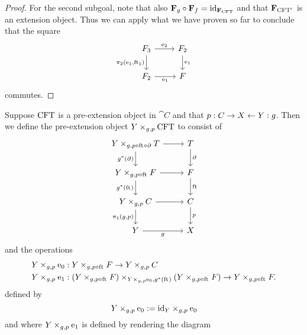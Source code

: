 \begin{proof}
For the second subgoal, note that also $\mathbf{F}_{g}\circ\mathbf{F}_{f}=
{\mathrm{id}_{\mathbf{F}_{\mathrm{CFT}}}}$ and that $\mathbf{F}_{\mathrm{CFT}'}$ is an extension object.
Thus we can apply what we have proven so far to conclude that the square
\begin{equation*}
\begin{tikzcd}
\stesysf_3 
  \ar{r}{\eext{2}} 
  \ar{d}[swap]{\pullbackpr{2}{\efamext}{\eft[1]}} 
  & 
\stesysf_2 
  \ar{d}{\efamext}
  \\
\stesysf_2
  \ar{r}[swap]{\efamext} 
  & 
\stesysf
\end{tikzcd}
\end{equation*}
commutes.
\end{proof}

\begin{defn}\label{cobesys}
Suppose $\mathrm{CFT}$ is a pre-extension object in $\cat{C}$ and that 
$p:C\rightarrow X\leftarrow Y:g$.
Then we define the pre-extension object $\cobesys{Y}{\stesys}{g}{p}$ to consist of
\begin{equation*}
\begin{tikzcd}
\cobesys{Y}{\stesyst}{g}{p\circ\eft\circ\ebd}
  \ar{r}
  \ar{d}[swap]{g^\ast(\ebd)}
  &
\stesyst
  \ar{d}{\ebd}
  \\
\cobesys{Y}{\stesysf}{g}{p\circ\eft}
  \ar{r}
  \ar{d}[swap]{g^\ast(\eft)}
  &
\stesysf
  \ar{d}{\eft}
  \\
\cobesys{Y}{\stesysc}{g}{p}
  \ar{r}
  \ar{d}[swap]{\pullbackpr{1}{g}{p}}
  &
\stesysc
  \ar{d}{p}
  \\
Y \ar{r}[swap]{g}
  &
X
\end{tikzcd}
\end{equation*} 
and the operations
\begin{align*}
\cobesys{Y}{\ectxext}{g}{p} 
  & : \pullback{Y}{\stesysf}{g}{p\circ\eft}\to \pullback{Y}{\stesysc}{g}{p}\\
\cobesys{Y}{\efamext}{g}{p} 
  & : \pullback
    {\pullback{Y}{\stesysf}{g}{p\circ\eft}}
    {\pullback{Y}{\stesysf}{g}{p\circ\eft}}
    {\cobesys{Y}{\ectxext}{g}{p}}
    {g^\ast(\eft)}
  \to 
  \pullback{Y}{\stesysf}{g}{p\circ\eft}.
\end{align*}
defined by
\begin{equation*}
\cobesys{Y}{\ectxext}{g}{p} := \pullback{\catid{Y}}{\ectxext}{g}{p}
\end{equation*}
and where $\cobesys{Y}{\efamext}{g}{p}$ is defined by rendering the diagram
\begin{equation*}
\begin{tikzcd}[column sep=large]

\end{tikzcd}
\end{equation*}
\end{defn}
